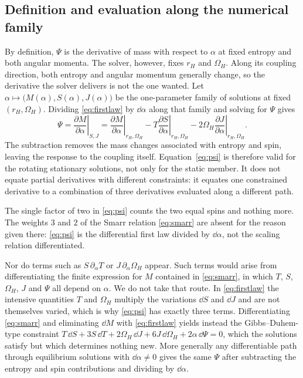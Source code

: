 \documentclass[11pt,a4paper]{article}
\begin{document}
\subsection{Definition and evaluation along the numerical family}

By definition, $\Psi$ is the derivative of mass with respect to $\alpha$
at fixed entropy and both angular momenta. The solver, however, fixes
$r_H$ and $\Omega_H$. Along its coupling direction, both entropy and
angular momentum generally change, so the derivative the solver delivers is
not the one wanted. Let $\alpha\mapsto\bigl(M(\alpha),S(\alpha),J(\alpha)\bigr)$
be the one-parameter family of solutions at fixed $(r_H,\Omega_H)$. Dividing
\eqref{eq:firstlaw} by $\dd\alpha$ along that family and solving for $\Psi$
gives
\begin{equation}
 \boxed{\displaystyle
 \Psi=\left.\frac{\partial M}{\partial\alpha}\right|_{S,J}
 =\left.\frac{\partial M}{\partial\alpha}\right|_{r_H,\Omega_H}
 -T\left.\frac{\partial S}{\partial\alpha}\right|_{r_H,\Omega_H}
 -2\Omega_H\left.\frac{\partial J}{\partial\alpha}\right|_{r_H,\Omega_H}.}
 \label{eq:psi}
\end{equation}
The subtraction removes the mass changes associated with entropy and spin,
leaving the response to the coupling itself. Equation~\eqref{eq:psi} is
therefore valid for the rotating stationary solutions, not only for the
static member. It does not equate partial derivatives with different
constraints: it equates one constrained derivative to a combination of
three derivatives evaluated along a different path.

The single factor of two in \eqref{eq:psi} counts the two equal spins and
nothing more. The weights $3$ and $2$ of the Smarr relation \eqref{eq:smarr}
are absent for the reason given there: \eqref{eq:psi} is the differential
first law divided by $\dd\alpha$, not the scaling relation differentiated.

Nor do terms such as $S\,\partial_\alpha T$ or $J\,\partial_\alpha\Omega_H$
appear. Such terms would arise from differentiating the finite expression for
$M$ contained in \eqref{eq:smarr}, in which $T$, $S$, $\Omega_H$, $J$ and
$\Psi$ all depend on $\alpha$. We do not take that route. In
\eqref{eq:firstlaw} the intensive quantities $T$ and $\Omega_H$ multiply the
variations $\dd S$ and $\dd J$ and are not themselves varied, which is why
\eqref{eq:psi} has exactly three terms. Differentiating \eqref{eq:smarr}
and eliminating $\dd M$ with \eqref{eq:firstlaw} yields instead the
Gibbs--Duhem-type constraint
$T\,\dd S+3S\,\dd T+2\Omega_H\,\dd J+6J\,\dd\Omega_H+2\alpha\,\dd\Psi=0$,
which the solutions satisfy but which determines nothing new.
More generally any differentiable path through equilibrium solutions with
$\dd\alpha\ne0$ gives the same $\Psi$ after subtracting the entropy and spin
contributions and dividing by $\dd\alpha$.
\end{document}
